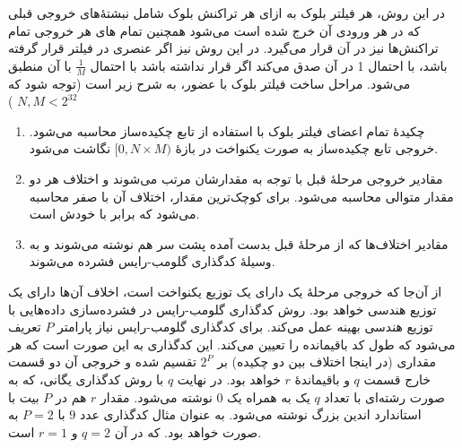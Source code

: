 در این روش، هر فیلتر بلوک به ازای هر تراکنش‌ بلوک شامل نبشتهٔ‌های خروجی قبلی که در هر ورودی‌ آن خرج شده است می‌شود همچنین تمام های هر خروجی تمام تراکنش‌ها نیز در آن قرار می‌گیرد. در این روش نیز اگر عنصری در فیلتر قرار گرفته باشد، با احتمال 1 در آن صدق می‌کند اگر قرار نداشته باشد با احتمال $\frac{1}{M}$ با آن منطبق می‌شود. مراحل ساخت فیلتر بلوک با  عضور، به شرح زیر است (توجه شود که
$N,M < 2^{32}$
)
\begin{enumerate}
	\item {%
	چکیدهٔ تمام اعضای فیلتر بلوک با استفاده از تابع چکیده‌ساز  محاسبه می‌شود. خروجی تابع چکیده‌ساز به صورت یکنواخت در بازهٔ 
	$[0, N\times M)$
	نگاشت می‌شود. 
}

\item {%
	مقادیر خروجی مرحلهٔ قبل با توجه به مقدارشان مرتب می‌شوند و اختلاف هر دو مقدار متوالی محاسبه می‌شود. برای کوچک‌ترین مقدار، اختلاف آن با صفر محاسبه می‌شود که برابر با خودش است.
 }

\item {%
مقادیر اختلاف‌ها که از مرحلهٔ قبل بدست آمده پشت سر هم نوشته می‌شوند و به وسیلهٔ کدگذاری گلومب-رایس فشرده می‌شوند.
}

\end{enumerate}

از آن‌جا که خروجی مرحلهٔ یک دارای یک توزیع یکنواخت است،‌ اخلاف آن‌ها دارای یک توزیع هندسی خواهد بود. روش کدگذاری گلومب-رایس در فشرده‌سازی داده‌هایی با توزیع هندسی بهینه عمل می‌کند\cite{Osuntokun2-2017}. برای کدگذاری گلومب-رایس نیاز پارامتر $P$ تعریف می‌شود که طول کد باقیمانده را تعیین می‌کند. این کد‌گذاری به این صورت است که هر مقداری (در اینجا اختلاف بین دو چکیده) بر $2^P$ تقسیم شده و خروجی آن دو قسمت خارج قسمت $q$ و باقیماندهٔ $r$ خواهد بود. در نهایت $q$ با روش کدگذاری یگانی، که به صورت رشته‌ای با تعداد $q$ یک به همراه یک $0$ نوشته می‌شود. مقدار $r$ هم در $P$ بیت با استاندارد اندین بزرگ نوشته می‌شود. به عنوان مثال کدگذاری عدد $9$ با $P=2$  به صورت
 خواهد بود. که در آن $q=2$ و $r=1$ است.
 
